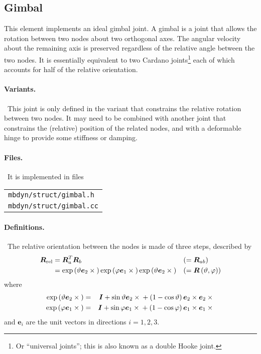 \documentclass[10pt,dvips,fleqn,subeqn]{report}
\newcommand{\T}[1]{\boldsymbol{#1}}
\begin{document}
\subsection{Gimbal}
\label{sec:GimbalRotationJoint}
This element implements an ideal gimbal joint.
A gimbal is a joint that allows the rotation between two nodes
about two orthogonal axes.
The angular velocity about the remaining axis is preserved regardless
of the relative angle between the two nodes.
It is essentially equivalent to two Cardano joints\footnote{Or
``universal joints''; this is also known as a double Hooke joint.}
each of which accounts for half of the relative orientation.

\paragraph{Variants.} \
This joint is only defined in the variant that constrains the relative
rotation between two nodes.
It may need to be combined with another joint that constrains
the (relative) position of the related nodes,
and with a deformable hinge to provide some stiffness or damping.

\paragraph{Files.} \
It is implemented in files

\begin{tabular}{l}
\texttt{mbdyn/struct/gimbal.h} \\
\texttt{mbdyn/struct/gimbal.cc}
\end{tabular}

\paragraph{Definitions.} \
The relative orientation between the nodes is made of three steps,
described by
\begin{align}
	\T{R}_{\text{rel}}
	&= \T{R}_a^T \T{R}_b & & ( = \T{R}_{ab} )
	\label{eq:gimbal:R_a_b} \\
	&= \llk{exp}\plbr{\vartheta \T{e}_2 \times{}}
		\llk{exp}\plbr{\varphi \T{e}_1 \times{}}
		\llk{exp}\plbr{\vartheta \T{e}_2 \times{}}
	& & ( = \T{R}\plbr{\vartheta, \varphi} )
	\label{eq:gimbal:R_theta_phi}
\end{align}
where
\begin{eqnarray}
	\llk{exp}\plbr{\vartheta \T{e}_2 \times{}} & = &
		\T{I} + \sin\vartheta \T{e}_2\times{}
			+ \plbr{1 - \cos\vartheta}\T{e}_2\times\T{e}_2\times{}
		\label{eq:GIMBAL-EXP-THETA} \\
	\llk{exp}\plbr{\varphi \T{e}_1 \times{}} & = &
		\T{I} + \sin\varphi \T{e}_1\times{}
			+ \plbr{1 - \cos\varphi}\T{e}_1\times\T{e}_1\times{}
		\label{eq:GIMBAL-EXP-PHI}
\end{eqnarray}
and $\T{e}_i$ are the unit vectors in directions $i=1,2,3$.
\end{document}
